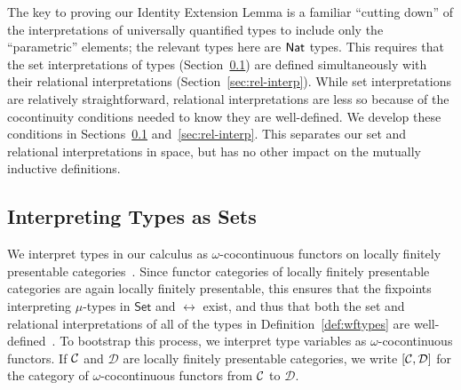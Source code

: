 \documentclass[runningheads]{llncs}
\newcommand{\set}{\mathsf{Set}}
\newcommand{\D}{\mathcal{D}}
\begin{document}
The key to proving our Identity Extension Lemma is a familiar
``cutting down'' of the interpretations of universally quantified
types to include only the ``parametric'' elements; the relevant types
here are $\mathsf{Nat}$ types.  This requires that the set interpretations of
types (Section~\ref{sec:set-interp}) are defined simultaneously with
their relational interpretations (Section~\ref{sec:rel-interp}).
While set interpretations are relatively straightforward, relational
interpretations are less so because of the cocontinuity conditions
needed to know they are well-defined. We develop these conditions in
Sections~\ref{sec:set-interp} and~\ref{sec:rel-interp}. This 
separates our set and relational interpretations in space, but
has no other impact on the mutually inductive definitions.

\vspace*{-0.15in}

\subsection{Interpreting Types as Sets}\label{sec:set-interp}

\vspace*{-0.05in}

We interpret types in our calculus as $\omega$-cocontinuous functors
on locally finitely presentable categories~\cite{ar94}. Since functor
categories of locally finitely presentable categories are again
locally finitely presentable, this ensures that the fixpoints
interpreting $\mu$-types in $\set$ and $\rel$ exist, and thus that
both the set and relational interpretations of all of the types in
Definition~\ref{def:wftypes} are well-defined~\cite{jp19}. To
bootstrap this process, we interpret type variables as
$\omega$-cocontinuous functors.  If $\cal C$ and $\D$ are locally
finitely presentable categories, we write $[\cal C,\D]$ for the
category of $\omega$-cocontinuous functors from $\cal C$ to $\D$.
\end{document}
